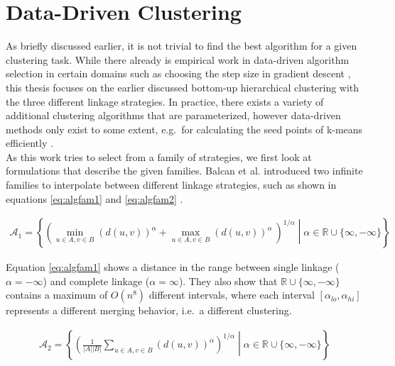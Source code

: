 \section{Data-Driven Clustering}

As briefly discussed earlier, it is not trivial to find the best algorithm for a given clustering task. While there already is empirical work in data-driven algorithm selection in certain domains such as choosing the step size in gradient descent \cite{DBLP:journals/corr/GuptaR15b}, this thesis focuses on the earlier discussed bottom-up hierarchical clustering with the three different linkage strategies. In practice, there exists a variety of additional clustering algorithms that are parameterized, however data-driven methods only exist to some extent, e.g.\ for calculating the seed points of k-means efficiently \cite{arthur2007k}.\\

As this work tries to select from a family of strategies, we first look at formulations that describe the given families. Balcan et al. introduced two infinite families to interpolate between different linkage strategies, such as shown in equations \ref{eq:algfam1} and \ref{eq:algfam2} \cite{DBLP:journals/corr/BalcanNVW16}.

\begin{equation}
    \begin{aligned}
        \mathcal{A}_1 = \left\{ \left( \min\limits_{u \in A, v \in B} (d(u,v))^\alpha + \max\limits_{u \in A, v \in B} (d(u,v))^\alpha\ \right)^{1 / \alpha} \middle| \alpha \in \mathbb{R} \cup \{\infty, -\infty\} \right\}
    \end{aligned}
    \label{eq:algfam1}
\end{equation}

Equation \ref{eq:algfam1} shows a distance in the range between single linkage ($\alpha = -\infty$) and complete linkage ($\alpha = \infty$). They also show that $\mathbb{R} \cup \{\infty, -\infty\}$ contains a maximum of $O(n^8)$ different intervals, where each interval $[\alpha_{lo}, \alpha_{hi}]$ represents a different merging behavior, i.e.\ a different clustering.

\begin{equation}
    \begin{aligned}
        \mathcal{A}_2 = \left\{ \left( \frac{1}{|A| |B|} \sum\limits_{u \in A, v \in B} (d(u,v))^\alpha \right)^{1 / \alpha} \middle| \alpha \in \mathbb{R} \cup \{\infty, -\infty\} \right\}
    \end{aligned}
    \label{eq:algfam2}
\end{equation}

